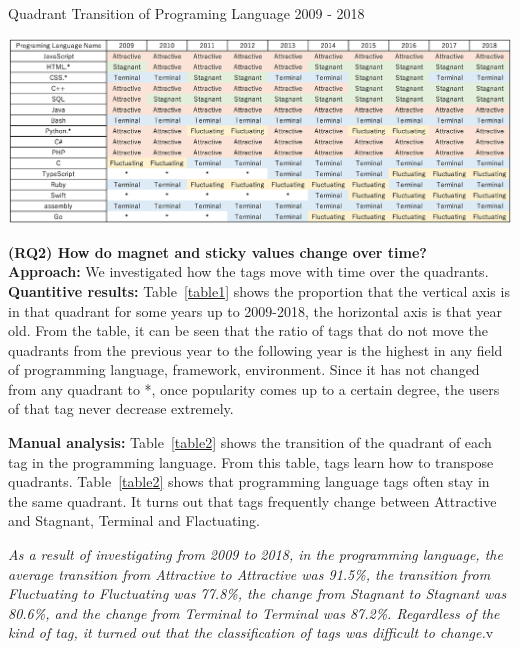 \documentclass[conference]{IEEEtran}
\begin{document}
\begin{table}[h]
 \centering
 \caption{Quadrant Transition of Programing Language 2009 - 2018} 
 \includegraphics[width=.9\hsize]{img/LanguageASFT.eps} 
 \label{table2} 
\end{table}


\textbf{(RQ2) How do magnet and sticky values change over time?} \\
\smallskip\smallskip
\textbf{Approach:}
We investigated how the tags move with time over the quadrants.\\
\textbf{Quantitive results:}
Table~\ref{table1} shows the proportion that the vertical axis is in that quadrant for some years up to 2009-2018, the horizontal axis is that year old. From the table, it can be seen that the ratio of tags that do not move the quadrants from the previous year to the following year is the highest in any field of programming language, framework, environment. Since it has not changed from any quadrant to *, once popularity comes up to a certain degree, the users of that tag never decrease extremely.
\smallskip\smallskip


\textbf{Manual analysis:}
Table~\ref{table2} shows the transition of the quadrant of each tag in the programming language. From this table, tags learn how to transpose quadrants.
Table~\ref{table2} shows that programming language tags often stay in the same quadrant. It turns out that tags frequently change between Attractive and Stagnant, Terminal and Flactuating.
\smallskip\smallskip

\begin{oframed}
\emph{As a result of investigating from 2009 to 2018, in the programming language, the average transition from Attractive to Attractive was 91.5\%, the transition from Fluctuating to Fluctuating was 77.8\%, the change from Stagnant to Stagnant was 80.6\%, and the change from Terminal to Terminal was 87.2\%.  Regardless of the kind of tag, it turned out that the classification of tags was difficult to change.}v
\end{oframed}
\end{document}
